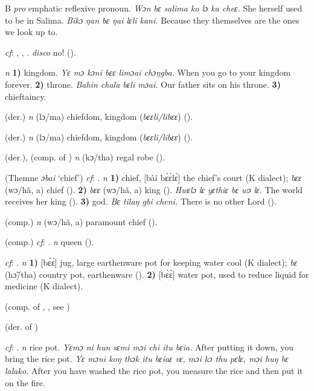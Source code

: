\begin{letter}{B}
 \textit{pro} emphatic reflexive pronoun. \textit{Wɔn bɛ salima ko lɔ ka cheɛ.} She herself used to be in Salima. \textit{Bikɔ ŋan bɛ ŋai lɛli kani.} Because they themselves are the ones we look up to.

 \textit{cf}: , , . \textit{disco} no! (\citealt{Pichl1967}). 

 \textit{n} \textbf{1)} kingdom. \textit{Yɛ mɔ kɔni bɛɛ limɔai chɔŋgba.} When you go to your kingdom forever. \textbf{2)} throne. \textit{Bahin chala bɛli mɔai.} Our father sits on his throne. \textbf{3)} chieftaincy.

 (der.) \textit{n} (lɔ/ma) chiefdom, kingdom (\textit{bɛɛli/libɛɛ}) (\citealt{Pichl1967}). 

 (der.) \textit{n} (lɔ/ma) chiefdom, kingdom (\textit{bɛɛli/libɛɛ}) (\citealt{Pichl1967}).

 (der.), (comp. of ) \textit{n} (kɔ/tha) regal robe (\citealt{Pichl1967}).

 (Themne \textit{ɔbai} ‘chief') \textit{cf}: . \textit{n} \textbf{1)} chief, [bàí bɛ̀ɛ̀lɛ̀] the chief's court (K dialect); \textit{bɛɛ} (wɔ/hã, a) chief (\citealt{Pichl1967}). \textbf{2)} \textit{bɛɛ} (wɔ/hã, a) king (\citealt{Pichl1967}). \textit{Hwɛlɔ lɛ yɛthiɛ bɛ wɔ lɛ.} The world receives her king (\citealt{Pichl1967}). \textbf{3)} god. \textit{Bɛ tilaŋ gbi cheni.} There is no other Lord (\citealt{Pichl1967}). 

 (comp.) \textit{n} (wɔ/hã, a) paramount chief (\citealt{Pichl1967}).

 (comp.) \textit{cf}: . \textit{n} queen (\citealt{Pichl1967}). 

 \textit{cf}: . \textit{n} \textbf{1)} [bɛ́ɛ́] jug, large earthenware pot for keeping water cool (K dialect); \textit{bɛ} (hɔ̃/tha) country pot, earthenware (\citealt{Pichl1967}). \textbf{2)} [bɛ̀ɛ̀] water pot, used to reduce liquid for medicine (K dialect). 

 (comp. of , , see )

 (der. of ) 

 \textit{cf}: . \textit{n} rice pot. \textit{Yɛmɔ ni hun sɛmi mɔi chi itu bɛia.} After putting it down, you bring the rice pot. \textit{Yɛ mɔni koŋ thɔk itu bɛiaɛ vɛ, mɔi kɔ thu pɛlɛ, mɔi huŋ bɛ lalako.} After you have washed the rice pot, you measure the rice and then put it on the fire.


\end{letter}
